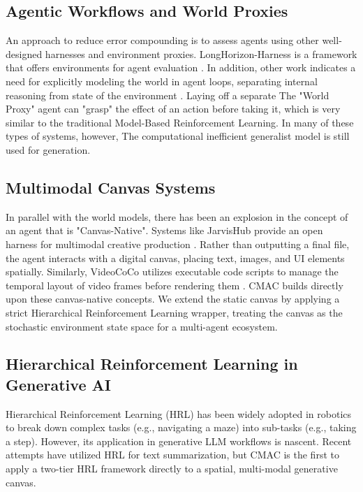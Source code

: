 \documentclass[pdflatex,sn-mathphys-num]{sn-jnl}
\begin{document}
\subsection{Agentic Workflows and World Proxies}
An approach to reduce error compounding is to assess agents using other well-designed harnesses and environment proxies. LongHorizon-Harness is a framework that offers environments for agent evaluation \cite{b29}. In addition, other work indicates a need for explicitly modeling the world in agent loops, separating internal reasoning from state of the environment \cite{b30}. Laying off a separate The "World Proxy" agent can "grasp" the effect of an action before taking it, which is very similar to the traditional Model-Based Reinforcement Learning. In many of these types of systems, however, The computational inefficient generalist model is still used for generation.

\subsection{Multimodal Canvas Systems}
In parallel with the world models, there has been an explosion in the concept of an agent that is "Canvas-Native". Systems like JarvisHub provide an open harness for multimodal creative production \cite{b1}. Rather than outputting a final file, the agent interacts with a digital canvas, placing text, images, and UI elements spatially. Similarly, VideoCoCo utilizes executable code scripts to manage the temporal layout of video frames before rendering them \cite{b2}. CMAC builds directly upon these canvas-native concepts. We extend the static canvas by applying a strict Hierarchical Reinforcement Learning wrapper, treating the canvas as the stochastic environment state space for a multi-agent ecosystem.

\subsection{Hierarchical Reinforcement Learning in Generative AI}
Hierarchical Reinforcement Learning (HRL) has been widely adopted in robotics to break down complex tasks (e.g., navigating a maze) into sub-tasks (e.g., taking a step). However, its application in generative LLM workflows is nascent. Recent attempts have utilized HRL for text summarization, but CMAC is the first to apply a two-tier HRL framework directly to a spatial, multi-modal generative canvas.
\end{document}
